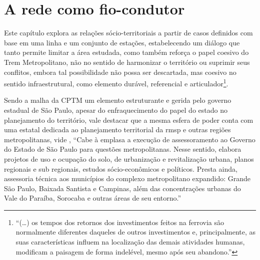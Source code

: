 %
%
	\chapter{A rede como fio-condutor}
	
	Este capítulo explora as relações sócio-territoriais a partir de casos definidos com base em uma linha e um conjunto de estações, estabelecendo um diálogo que tanto permite limitar a área estudada, como também reforça o papel coesivo do Trem Metropolitano, não no sentido de harmonizar o território ou suprimir seus conflitos, embora tal possibilidade não possa ser descartada, mas coesivo no sentido infraestrutural, como elemento durável, referencial e articulador\footnote{``(\dots) os tempos dos retornos dos investimentos feitos na ferrovia são normalmente diferentes daqueles de outros investimentos e, principalmente, as suas
	características influem na localização das demais atividades humanas, modificam a paisagem de forma indelével, mesmo após seu abandono.''}.
	
	Sendo a malha da CPTM um elemento estruturante e gerida pelo governo estadual de São Paulo, apesar do enfraquecimento do papel do estado no planejamento do território, vale destacar que a mesma esfera de poder conta com uma estatal dedicada ao planejamento territorial da \gls{rmsp} e outras regiões metropolitanas, vide , ``Cabe à \gls{emplasa} a execução de assessoramento ao Governo do Estado de São Paulo para questões metropolitanas. Nesse sentido, elabora projetos de uso e ocupação do solo, de urbanização e revitalização urbana, planos regionais e sub regionais, estudos sócio-econômicos e políticos. Presta ainda, assessoria técnica aos municípios do complexo metropolitano expandido: Grande São Paulo, Baixada Santista e Campinas, além das concentrações urbanas do Vale do Paraíba, Sorocaba e outras áreas de seu entorno.''
	

